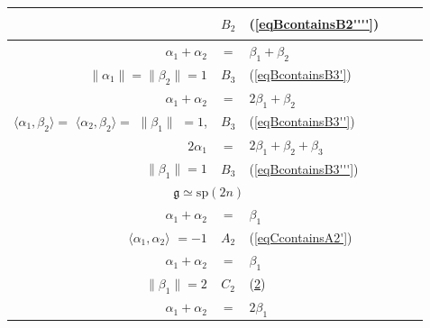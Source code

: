 \documentclass[12pt]{report}
\newcommand{\gG}{\mathfrak{g}}
\newcommand{\sP}{\mathrm{sp}}
\begin{document}
\begin{longtable}{rcl | c |c c}
\begin{tabular}{l}
\end{tabular}&
 $B_2$&
 {equation} \label{eqBcontainsB2''''} (\ref{eqBcontainsB2''''}) \\\hline
$\alpha_1+\alpha_2$ &$=$&$\beta_1+\beta_2$&  
\begin{tabular}{l}
$\langle\alpha_1, \beta_1 \rangle=$  $\langle\alpha_2,\beta_1\rangle=$ $\langle\alpha_2,\beta_2\rangle$ $=1$, \\
$\|\alpha_1\|=\|\beta_2\|=1 $ 
\end{tabular}&
 $B_3$&
{equation} \label{eqBcontainsB3'} (\ref{eqBcontainsB3'}) \\\hline
$\alpha_1+\alpha_2$ &$=$&$2\beta_1+\beta_2$&  
\begin{tabular}{l}
$\langle\alpha_1, \alpha_2 \rangle=$ $\langle\alpha_1,\beta_1\rangle=$ $\langle\alpha_2,\beta_1\rangle$ $=1$, \\
$\langle\alpha_1,\beta_2\rangle=$ $\langle\alpha_2,\beta_2\rangle=$ $\|\beta_1\|$ $=1$, 
\end{tabular}&
 $B_3$&
 {equation} \label{eqBcontainsB3''} (\ref{eqBcontainsB3''}) \\\hline
$2\alpha_1$ &$=$&$2\beta_1+\beta_2+\beta_3$&  
\begin{tabular}{l}
$\langle\alpha_1, \beta_1 \rangle=$ $\langle\alpha_1,\beta_2\rangle=$ $\langle\alpha_1,\beta_3\rangle$ $=1$, \\
$\|\beta_1\|=1 $ 
\end{tabular}&
$B_3$&
{equation} \label{eqBcontainsB3'''} (\ref{eqBcontainsB3'''}) \\\hline
\multicolumn{5}{c}{$\gG\simeq\sP(2n)$}\\\hline
$\alpha_1+\alpha_2$ &$=$&$\beta_1$&
\begin{tabular}{l}
$\langle\alpha_1, \beta_1 \rangle$ $=$ $\langle\alpha_2,\beta_1\rangle$ $=1$\\
$\langle\alpha_1,\alpha_2\rangle$ $=-1$
\end{tabular}&
$A_2$&
{equation} \label{eqCcontainsA2'} (\ref{eqCcontainsA2'})\\\hline
$\alpha_1+\alpha_2$ &$=$&$\beta_1$&
\begin{tabular}{l}
$\langle\alpha_1, \beta_1 \rangle$ $=$ $\langle\alpha_2,\beta_1\rangle$ $=2$,\\
$\|\beta_1\|=2$
\end{tabular}&
$C_2$&
{equation} \label{eqCcontainsC2'} (\ref{eqCcontainsC2'}) \\\hline
$\alpha_1+\alpha_2$ &$=$&$2\beta_1$&

\end{longtable}
\end{document}
